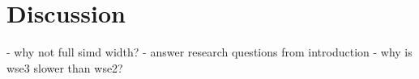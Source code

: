 \chapter{Discussion}
- why not full simd width?
- answer research questions from introduction
- why is wse3 slower than wse2? 